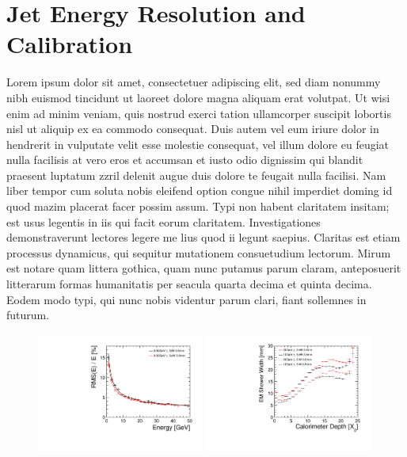 \documentclass[final,3p,times,twocolumn]{elsarticle}
\begin{document}
\section{Jet Energy Resolution and Calibration}
Lorem ipsum dolor sit amet, consectetuer adipiscing elit, sed diam nonummy nibh euismod tincidunt ut laoreet dolore magna aliquam erat volutpat. Ut wisi enim ad minim veniam, quis
nostrud exerci tation ullamcorper suscipit lobortis nisl ut aliquip ex ea commodo consequat. Duis autem vel eum iriure dolor in hendrerit in vulputate velit esse molestie consequat,
vel illum dolore eu feugiat nulla facilisis at vero eros et accumsan et iusto odio dignissim qui blandit praesent luptatum zzril delenit augue duis dolore te feugait nulla facilisi.
Nam liber tempor cum soluta nobis eleifend option congue nihil imperdiet doming id quod mazim placerat facer possim assum. Typi non habent claritatem insitam; est usus legentis in
iis qui facit eorum claritatem. Investigationes demonstraverunt lectores legere me lius quod ii legunt saepius. Claritas est etiam processus dynamicus, qui sequitur mutationem
consuetudium lectorum. Mirum est notare quam littera gothica, quam nunc putamus parum claram, anteposuerit litterarum formas humanitatis per seacula quarta decima et quinta
decima. Eodem modo typi, qui nunc nobis videntur parum clari, fiant sollemnes in futurum.



\begin{figure}[!h]
  \begin{center}
     \includegraphics[width=0.49\textwidth]{ERes_vs_Egamma.pdf}
     \includegraphics[width=0.49\textwidth]{SiSc_TProfile.pdf}
     \caption{\label{}}
  \end{center}
\end{figure}
\end{document}
